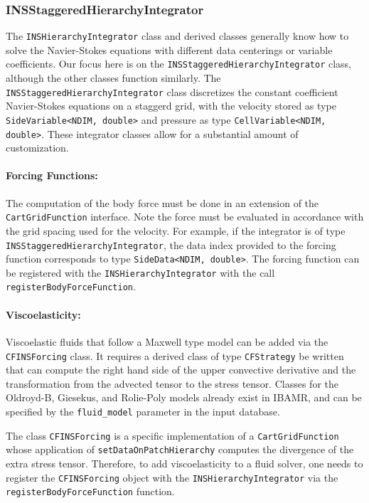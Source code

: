 \documentclass{article}
\begin{document}
\subsubsection{INSStaggeredHierarchyIntegrator}
The \verb|INSHierarchyIntegrator| class and derived classes generally know how to solve the Navier-Stokes equations with different data centerings or variable coefficients. Our focus here is on the \verb|INSStaggeredHierarchyIntegrator| class, although the other classes function similarly. The \verb|INSStaggeredHierarchyIntegrator| class discretizes the constant coefficient Navier-Stokes equations on a staggerd grid, with the velocity stored as type \verb|SideVariable<NDIM, double>| and pressure as type \verb|CellVariable<NDIM, double>|. These integrator classes allow for a substantial amount of customization.

\paragraph{Forcing Functions:}
The computation of the body force must be done in an extension of the \verb|CartGridFunction| interface. Note the force must be evaluated in accordance with the grid spacing used for the velocity. For example, if the integrator is of type \verb|INSStaggeredHierarchyIntegrator|, the data index provided to the forcing function corresponds to type \verb|SideData<NDIM, double>|. The forcing function can be registered with the \verb|INSHierarchyIntegrator| with the call \verb|registerBodyForceFunction|. 

\paragraph{Viscoelasticity:}
Viscoelastic fluids that follow a Maxwell type model can be added via the \verb|CFINSForcing| class. It requires a derived class of type \verb|CFStrategy| be written that can compute the right hand side of the upper convective derivative and the transformation from the advected tensor to the stress tensor. Classes for the Oldroyd-B, Giesekus, and Rolie-Poly models already exist in IBAMR, and can be specified by the \verb|fluid_model| parameter in the input database.

The class \verb|CFINSForcing| is a specific implementation of a \verb|CartGridFunction| whose application of \verb|setDataOnPatchHierarchy| computes the divergence of the extra stress tensor. Therefore, to add viscoelasticity to a fluid solver, one needs to register the \verb|CFINSForcing| object with the \verb|INSHierarchyIntegrator| via the \verb|registerBodyForceFunction| function.
\end{document}
